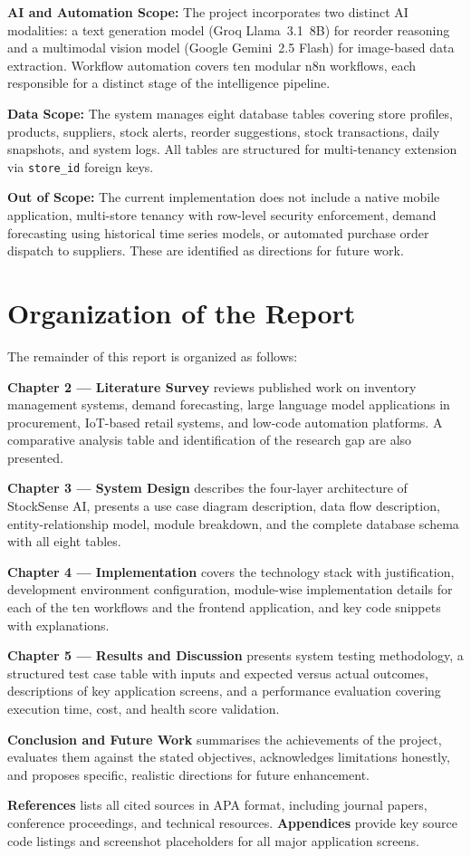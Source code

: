 \textbf{AI and Automation Scope:} The project incorporates two distinct AI modalities: a text
generation model (Groq Llama~3.1~8B) for reorder reasoning and a multimodal vision model
(Google Gemini~2.5 Flash) for image-based data extraction. Workflow automation covers ten
modular n8n workflows, each responsible for a distinct stage of the intelligence pipeline.

\textbf{Data Scope:} The system manages eight database tables covering store profiles, products,
suppliers, stock alerts, reorder suggestions, stock transactions, daily snapshots, and system
logs. All tables are structured for multi-tenancy extension via \texttt{store\_id} foreign keys.

\textbf{Out of Scope:} The current implementation does not include a native mobile application,
multi-store tenancy with row-level security enforcement, demand forecasting using historical time
series models, or automated purchase order dispatch to suppliers. These are identified as
directions for future work.

\section{Organization of the Report}

The remainder of this report is organized as follows:

\textbf{Chapter 2 — Literature Survey} reviews published work on inventory management systems,
demand forecasting, large language model applications in procurement, IoT-based retail systems,
and low-code automation platforms. A comparative analysis table and identification of the research
gap are also presented.

\textbf{Chapter 3 — System Design} describes the four-layer architecture of StockSense AI,
presents a use case diagram description, data flow description, entity-relationship model, module
breakdown, and the complete database schema with all eight tables.

\textbf{Chapter 4 — Implementation} covers the technology stack with justification, development
environment configuration, module-wise implementation details for each of the ten workflows and
the frontend application, and key code snippets with explanations.

\textbf{Chapter 5 — Results and Discussion} presents system testing methodology, a structured
test case table with inputs and expected versus actual outcomes, descriptions of key application
screens, and a performance evaluation covering execution time, cost, and health score validation.

\textbf{Conclusion and Future Work} summarises the achievements of the project, evaluates them
against the stated objectives, acknowledges limitations honestly, and proposes specific, realistic
directions for future enhancement.

\textbf{References} lists all cited sources in APA format, including journal papers, conference
proceedings, and technical resources. \textbf{Appendices} provide key source code listings and
screenshot placeholders for all major application screens.
